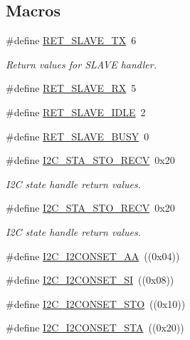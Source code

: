 \subsection*{Macros}
\begin{DoxyCompactItemize}
\item 
\#define \hyperlink{group__I2C__17XX__40XX_ga49da135773ab760dbf75fcbcdb383623}{R\-E\-T\-\_\-\-S\-L\-A\-V\-E\-\_\-\-T\-X}~6
\begin{DoxyCompactList}\small\item\em Return values for S\-L\-A\-V\-E handler. \end{DoxyCompactList}\item 
\#define \hyperlink{group__I2C__17XX__40XX_ga16246f0e987c65b12170dd4f127e99f9}{R\-E\-T\-\_\-\-S\-L\-A\-V\-E\-\_\-\-R\-X}~5
\item 
\#define \hyperlink{group__I2C__17XX__40XX_gac3305a3a03ff55a1ee6ba304a09e0187}{R\-E\-T\-\_\-\-S\-L\-A\-V\-E\-\_\-\-I\-D\-L\-E}~2
\item 
\#define \hyperlink{group__I2C__17XX__40XX_gae5dd077e6273af4e15c3b656b56f9afd}{R\-E\-T\-\_\-\-S\-L\-A\-V\-E\-\_\-\-B\-U\-S\-Y}~0
\item 
\#define \hyperlink{group__I2C__17XX__40XX_ga6ed81fd3a1ae05f1fbf96525f1520cd3}{I2\-C\-\_\-\-S\-T\-A\-\_\-\-S\-T\-O\-\_\-\-R\-E\-C\-V}~0x20
\begin{DoxyCompactList}\small\item\em I2\-C state handle return values. \end{DoxyCompactList}\item 
\#define \hyperlink{group__I2C__17XX__40XX_ga6ed81fd3a1ae05f1fbf96525f1520cd3}{I2\-C\-\_\-\-S\-T\-A\-\_\-\-S\-T\-O\-\_\-\-R\-E\-C\-V}~0x20
\begin{DoxyCompactList}\small\item\em I2\-C state handle return values. \end{DoxyCompactList}\item 
\#define \hyperlink{group__I2C__17XX__40XX_ga784c4b2fe7f3299e338655d2ddbf283c}{I2\-C\-\_\-\-I2\-C\-O\-N\-S\-E\-T\-\_\-\-A\-A}~((0x04))
\item 
\#define \hyperlink{group__I2C__17XX__40XX_gaa447cd2686805ef8009fc599144ee3dc}{I2\-C\-\_\-\-I2\-C\-O\-N\-S\-E\-T\-\_\-\-S\-I}~((0x08))
\item 
\#define \hyperlink{group__I2C__17XX__40XX_gaae292803a059b84eac20ab8777d113af}{I2\-C\-\_\-\-I2\-C\-O\-N\-S\-E\-T\-\_\-\-S\-T\-O}~((0x10))
\item 
\#define \hyperlink{group__I2C__17XX__40XX_gabaad3370eb35644c135d40f06adbbba0}{I2\-C\-\_\-\-I2\-C\-O\-N\-S\-E\-T\-\_\-\-S\-T\-A}~((0x20))

\end{DoxyCompactItemize}
